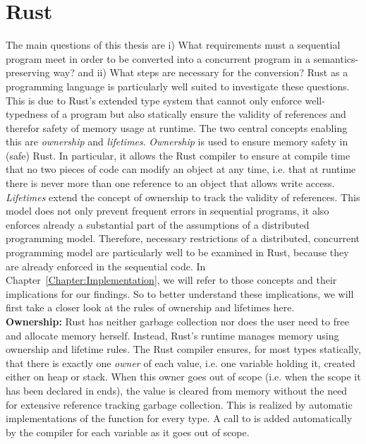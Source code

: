 \section{Rust}
\label{subsec:Rust}
The main questions of this thesis are i) What requirements must a sequential program meet in order to be converted into a concurrent program in a semantics-preserving way? and ii) What steps are necessary for the conversion? Rust as a programming language is particularly well suited to investigate these questions. This is due to Rust's extended type system that cannot only enforce well-typedness of a program but also statically ensure the validity of references and therefor safety of memory usage at runtime. The two central concepts enabling this are \emph{ownership} and \emph{lifetimes}. \emph{Ownership} is used to ensure memory safety in (safe) Rust. In particular, it allows the Rust compiler to ensure at compile time that no two pieces of code can modify an object at any time, i.e. that at runtime there is never more than one reference to an object that allows write access. \emph{Lifetimes} extend the concept of ownership to track the validity of references. This model does not only prevent frequent errors in sequential programs, it also enforces already a substantial part of the assumptions of a distributed programming model. Therefore, necessary restrictions of a distributed, concurrent programming model are particularly well to be examined in Rust, because they are already enforced in the sequential code. In Chapter~\ref{Chapter:Implementation}, we will refer to those concepts and their implications for our findings. So to better understand these implications, we will first take a closer look at the rules of ownership and lifetimes here.\\

\textbf{Ownership:} Rust has neither garbage collection nor does the user need to free and allocate memory herself. Instead, Rust's runtime manages memory using ownership and lifetime rules. The Rust compiler ensures, for most types statically, that there is exactly one \emph{owner} of each value, i.e. one variable holding it, created either on heap or stack. When this owner goes out of scope (i.e. when the scope it has been declared in ends), the value is cleared from memory without the need for extensive reference tracking garbage collection.
This is realized by automatic implementations of the  function for every type. A call to  is added automatically by the compiler for each variable as it goes out of scope.\\


